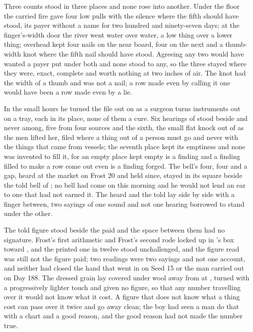 \scenebreak

Three counts stood in three places and none rose into another. Under the floor the carried fire gave four low pulls with the silence where the fifth should have stood, its payer without a name for two hundred and ninety-seven days; at the finger's-width door the river went water over water, a low thing over a lower thing; overhead  kept four nails on the near board, four on the next and a thumb-width knot where the fifth nail should have stood. Agreeing any two would have wanted a payer put under both and none stood to any, so the three stayed where they were, exact, complete and worth nothing at two inches of air. The knot had the width of a thumb and was not a nail; a row made even by calling it one would have been a row made even by a lie.

In the small hours he turned the file out on  as a surgeon turns instruments out on a tray, each in its place, none of them a cure. Six hearings of  stood beside and never among, five from four sources and the sixth, the small flat knock out of  as the men lifted her, filed where a thing out of a person must go and never with the things that came from vessels; the seventh place kept its emptiness and none was invented to fill it, for an empty place kept empty is a finding and a finding filled to make a row come out even is a finding forged. The bell's four, four and a gap, heard at the market on Frost 20 and held since, stayed in its square beside the told bell of ; no bell had come on this morning and he would not lend an ear to one that had not earned it. The heard and the told lay side by side with a finger between, two sayings of one sound and not one hearing borrowed to stand under the other.

The told figure stood beside the paid and the space between them had no signature. Frost's first arithmetic and Frost's second rode locked up  in 's box toward , and the printed one in twelve stood unchallenged, and the figure read was still not the figure paid; two readings were two sayings and not one account, and neither had closed the hand that went in on Seed 15 or the man carried out on Day 188. The dressed grain lay covered under wool away from  at , turned with a progressively lighter touch and given no figure, so that any number travelling over it would not know what it cost. A figure that does not know what a thing cost can pass over it twice and go away clean; the boy had seen a man do that with a chart and a good reason, and the good reason had not made the number true.

